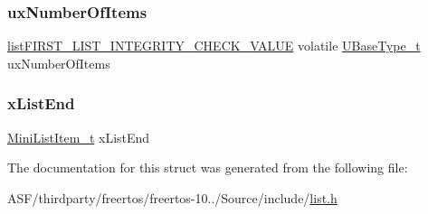 \subsubsection{\texorpdfstring{uxNumberOfItems}{uxNumberOfItems}}
{\footnotesize\ttfamily \mbox{\hyperlink{list_8h_a3a52b5a4f70d3a07e37a5814a23ba880}{list\+F\+I\+R\+S\+T\+\_\+\+L\+I\+S\+T\+\_\+\+I\+N\+T\+E\+G\+R\+I\+T\+Y\+\_\+\+C\+H\+E\+C\+K\+\_\+\+V\+A\+L\+UE}} volatile \mbox{\hyperlink{portmacro_8h_a646f89d4298e4f5afd522202b11cb2e6}{U\+Base\+Type\+\_\+t}} ux\+Number\+Of\+Items}

\mbox{\label{structx_l_i_s_t_a83a65be4e3a2bb70855742896126bf63}} 
\subsubsection{\texorpdfstring{xListEnd}{xListEnd}}
{\footnotesize\ttfamily \mbox{\hyperlink{list_8h_a542a8d55e98bc407593979e61f83cd02}{Mini\+List\+Item\+\_\+t}} x\+List\+End}



The documentation for this struct was generated from the following file\+:\begin{DoxyCompactItemize}
\item 
A\+S\+F/thirdparty/freertos/freertos-\/10../\+Source/include/\mbox{\hyperlink{list_8h}{list.\+h}}\end{DoxyCompactItemize}
